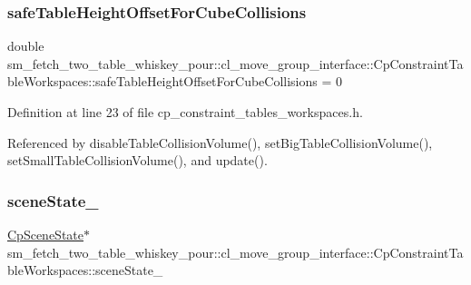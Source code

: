 \subsubsection{\texorpdfstring{safe\+Table\+Height\+Offset\+For\+Cube\+Collisions}{safeTableHeightOffsetForCubeCollisions}}
{\footnotesize\ttfamily double sm\+\_\+fetch\+\_\+two\+\_\+table\+\_\+whiskey\+\_\+pour\+::cl\+\_\+move\+\_\+group\+\_\+interface\+::\+Cp\+Constraint\+Table\+Workspaces\+::safe\+Table\+Height\+Offset\+For\+Cube\+Collisions = 0\hspace{0.3cm}{\ttfamily [private]}}



Definition at line 23 of file cp\+\_\+constraint\+\_\+tables\+\_\+workspaces.\+h.



Referenced by disable\+Table\+Collision\+Volume(), set\+Big\+Table\+Collision\+Volume(), set\+Small\+Table\+Collision\+Volume(), and update().

\mbox{\label{classsm__fetch__two__table__whiskey__pour_1_1cl__move__group__interface_1_1CpConstraintTableWorkspaces_a394e5c69c84b395bae91b0eafcb7342b}} 
\subsubsection{\texorpdfstring{scene\+State\+\_\+}{sceneState\_}}
{\footnotesize\ttfamily \hyperlink{classsm__fetch__two__table__whiskey__pour_1_1cl__perception__system_1_1CpSceneState}{Cp\+Scene\+State}$\ast$ sm\+\_\+fetch\+\_\+two\+\_\+table\+\_\+whiskey\+\_\+pour\+::cl\+\_\+move\+\_\+group\+\_\+interface\+::\+Cp\+Constraint\+Table\+Workspaces\+::scene\+State\+\_\+\hspace{0.3cm}{\ttfamily [private]}}



